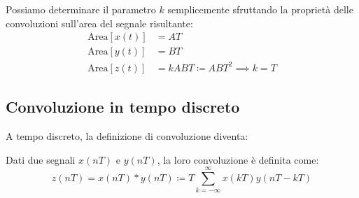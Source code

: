 Possiamo determinare il parametro $k$ semplicemente sfruttando la proprietà delle convoluzioni
sull'area del segnale risultante:
\[
    \begin{aligned}
        \text{Area}[x(t)] &= AT \\ 
        \text{Area}[y(t)] &= BT \\ 
        \text{Area}[z(t)] &= kABT \coloneqq ABT^2 \implies k=T
    \end{aligned}
\]
\subsection{Convoluzione in tempo discreto}

A tempo discreto, la definizione di convoluzione diventa:

\begin{definition}
    Dati due segnali $x(nT)$ e $y(nT)$, la loro convoluzione è definita come:
    \[
        z(nT) = x(nT) \ast y(nT) \coloneqq T\sum_{k=-\infty}^\infty x(kT)y(nT-kT)
    \] 
\end{definition}

